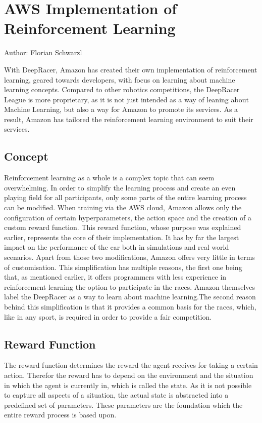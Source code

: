 \chapter{AWS Implementation of Reinforcement Learning}
Author: Florian Schwarzl

With DeepRacer, Amazon has created their own implementation of reinforcement learning, geared towards developers, with focus on learning about machine learning concepts. Compared to other robotics competitions, the DeepRacer League is more proprietary, as it is not just intended as a way of leaning about Machine Learning, but also a way for Amazon to promote its services. As a result, Amazon has tailored the reinforcement learning environment to suit their services. 

\section{Concept}
Reinforcement learning as a whole is a complex topic that can seem overwhelming. In order to simplify the learning process and create an even playing field for all participants, only some parts of the entire learning process can be modified. When training via the AWS cloud, Amazon allows only the configuration of certain hyperparameters, the action space and the creation of a custom reward function. This reward function, whose purpose was explained earlier, represents the core of their implementation. It has by far the largest impact on the performance of the car both in simulations and real world scenarios. Apart from those two modifications, Amazon offers very little in terms of customisation. This simplification has multiple reasons, the first one being that, as mentioned earlier, it offers programmers with less experience in reinforcement learning the option to participate in the races. Amazon themselves label the DeepRacer as a way to learn about machine learning.The second reason behind this simplification is that it provides a common basis for the races, which, like in any sport, is required in order to provide a fair competition.

\section{Reward Function}
The reward function determines the reward the agent receives for taking a certain action. Therefor the reward has to depend on the environment and the situation in which the agent is currently in, which is called the state. As it is not possible to capture all aspects of a situation, the actual state is abstracted into a predefined set of parameters. These parameters are the foundation which the entire reward process is based upon. 

